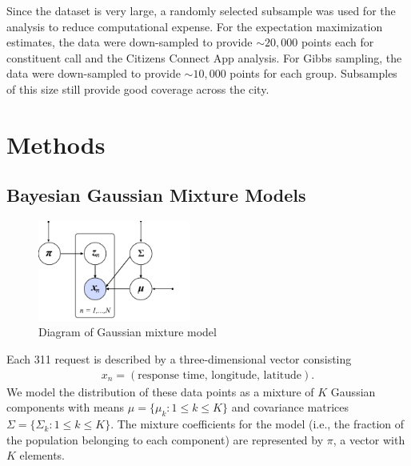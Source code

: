 \documentclass[twoside]{article}
\theoremstyle{theorem}
\theoremstyle{theorem}
\theoremstyle{theorem}
\theoremstyle{lemma}
\theoremstyle{definition}
\theoremstyle{example}
\begin{document}
Since the dataset is very large, a randomly selected subsample was used for the analysis to reduce computational expense. For the expectation maximization estimates, the data were down-sampled to provide $\sim20,000$ points each for constituent call and the Citizens Connect App analysis. For Gibbs sampling, the data were down-sampled to provide $\sim10,000$ points for each group. Subsamples of this size still provide good coverage across the city. 
\section{Methods}
\subsection{Bayesian Gaussian Mixture Models}
\begin{figure}
\begin{center}
\includegraphics[width=50mm]{graph_model}
\caption{Diagram of Gaussian mixture model}
\end{center}
\end{figure}
Each 311 request is described by a three-dimensional vector consisting 
\begin{align}
x_n = (\text{response time, longitude, latitude}). 
\end{align}
We model the distribution of these data points as a mixture of $K$ Gaussian components with means $\mu = \{\mu_k :  1\leq k\leq K\}$ and covariance matrices $\Sigma = \{\Sigma_k :  1\leq k\leq K\}$. The mixture coefficients for the model (i.e., the fraction of the population belonging to each component) are represented by $\pi$, a vector with $K$ elements.  
\end{document}
